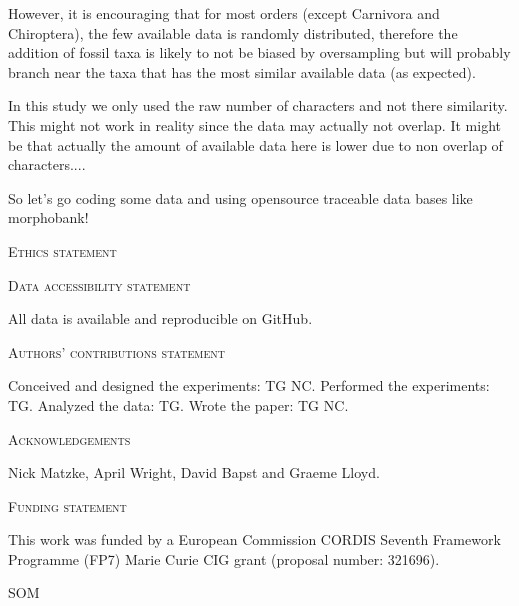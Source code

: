 \documentclass[12pt,letterpaper]{article}
\renewcommand{\section}[1]{%
\bigskip
\begin{center}
\begin{Large}
\normalfont\scshape #1
\medskip
\end{Large}
\end{center}}
\renewcommand{\subsection}[1]{%
\bigskip
\begin{center}
\begin{large}
\normalfont\itshape #1
\end{large}
\end{center}}
\begin{document}
However, it is encouraging that for most orders (except Carnivora and Chiroptera), the few available data is randomly distributed, therefore the addition of fossil taxa is likely to not be biased by oversampling but will probably branch near the taxa that has the most similar available data (as expected).

In this study we only used the raw number of characters and not there similarity. This might not work in reality since the data may actually not overlap. It might be that actually the amount of available data here is lower due to non overlap of characters....

So let's go coding some data and using opensource traceable data bases like morphobank!



\section{Ethics statement}
\section{Data accessibility statement}
All data is available and reproducible on GitHub.
\section{Authors’ contributions statement}
Conceived and designed the experiments: TG NC. Performed the experiments: TG. Analyzed the data: TG. Wrote the paper: TG NC.
\section{Acknowledgements}
Nick Matzke, April Wright, David Bapst and Graeme Lloyd.
\section{Funding statement}
This work was funded by a European Commission CORDIS Seventh Framework Programme (FP7) Marie Curie CIG grant (proposal number: 321696).





\section{SOM}




\end{document}
